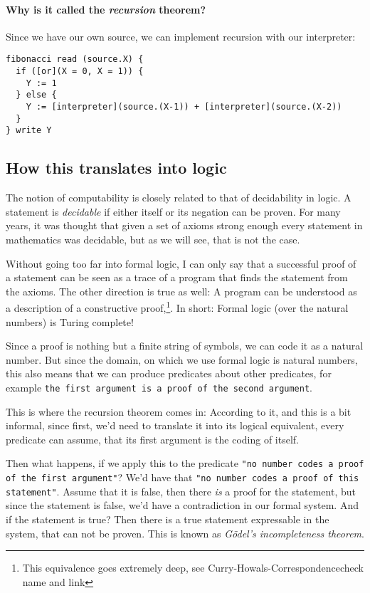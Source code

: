 \paragraph{Why is it called the {\em recursion} theorem?}
Since we have our own source, we can implement recursion with our interpreter:
\begin{verbatim}
fibonacci read (source.X) {
  if ([or](X = 0, X = 1)) {
    Y := 1
  } else {
    Y := [interpreter](source.(X-1)) + [interpreter](source.(X-2))
  }
} write Y
\end{verbatim}

\subsection{How this translates into logic}
The notion of computability is closely related to that of decidability in 
logic. A statement is {\em decidable}\/ if either itself or its negation can be 
proven. For many years, it was thought that given a set of axioms strong 
enough every statement in mathematics was decidable, but as we will 
see, that is not the case.

Without going too far into formal logic, I can only say that a successful 
proof of a statement can be seen as a trace of a program that finds the 
statement from the axioms. The other direction is true as well: A program can 
be understood as a description of a constructive proof,\footnote{This
equivalence goes extremely deep, see Curry-Howals-Correspondence\TODO check
name and link}. In short: Formal logic (over the natural numbers) is Turing
complete!

Since a proof is nothing but a finite string of symbols, we can code it as a
natural number. But since the domain, on which we use formal logic is natural
numbers, this also means that we can produce predicates about other predicates,
for example {\tt the first argument is a proof of the second argument}.

This is where the recursion theorem comes in: According to it, and this is a 
bit informal, since first, we'd need to translate it into its logical 
equivalent, every predicate can assume, that its first argument is the coding 
of itself.

Then what happens, if we apply this to the predicate {\tt "no number codes a proof 
of the first argument"}? We'd have that {\tt "no number codes a proof of this
statement"}. Assume that it is false, then there {\em is}\/ a proof for the 
statement, but since the statement is false, we'd have a contradiction in our 
formal system. And if the statement is true? Then there is a true statement 
expressable in the system, that can not be proven. This is known as {\em Gödel's 
incompleteness theorem}. 
